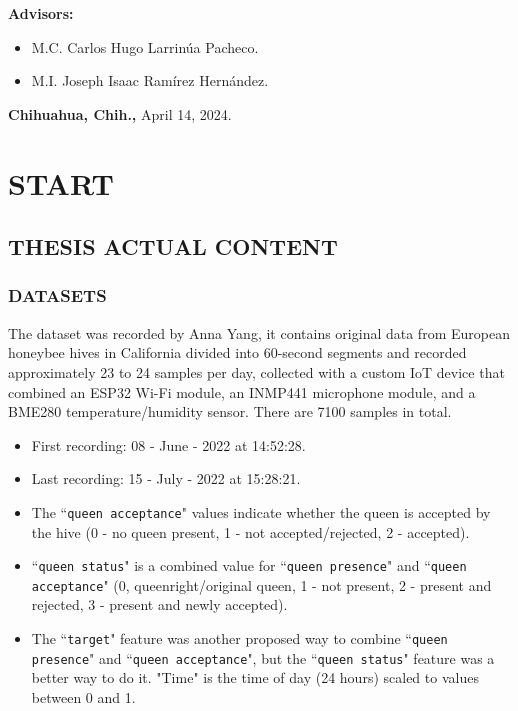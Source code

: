 \documentclass[12pt]{report}
\begin{document}
\begin{titlepage}
\begin{center}
			{\large \textbf{Advisors:}}\\[3.5ex]
			\begin{itemize}
				\item {\large M.C. Carlos Hugo Larrinúa Pacheco.}\\[3.5ex]
				\item {\large M.I. Joseph Isaac Ramírez Hernández.}\\[3.5ex]
			\end{itemize}
			\vfill
			{\large \textbf{Chihuahua, Chih.,} April 14, 2024.}\\[3.5ex]
		\end{center}
	\end{titlepage}

\part*{START}

\chapter{THESIS ACTUAL CONTENT}

\section{DATASETS}

\par The dataset\cite{AnnaYang-Dataset} was recorded by Anna Yang, it contains original data from European honeybee hives in California divided into 60-second segments and recorded approximately 23 to 24 samples per day, collected with a custom IoT device that combined an ESP32 Wi-Fi module, an INMP441 microphone module, and a BME280 temperature/humidity sensor. There are 7100 samples in total.
        
    \begin{itemize}
        \item First recording: 08 - June - 2022 at 14:52:28.
        \item Last recording: 15 - July - 2022 at 15:28:21.
        \item The ``{\tt queen acceptance}" values indicate whether the queen is accepted by the hive (0 - no queen present, 1 - not accepted/rejected, 2 - accepted).
        \item ``{\tt queen status}" is a combined value for ``{\tt queen presence}" and ``{\tt queen acceptance}" (0, queenright/original queen, 1 - not present, 2 - present and rejected, 3 - present and newly accepted).
        \item  The ``{\tt target}" feature was another proposed way to combine ``{\tt queen presence}" and ``{\tt queen acceptance}", but the ``{\tt queen status}" feature was a better way to do it. "Time" is the time of day (24 hours) scaled to values between 0 and 1.
    \end{itemize}
\end{document}
